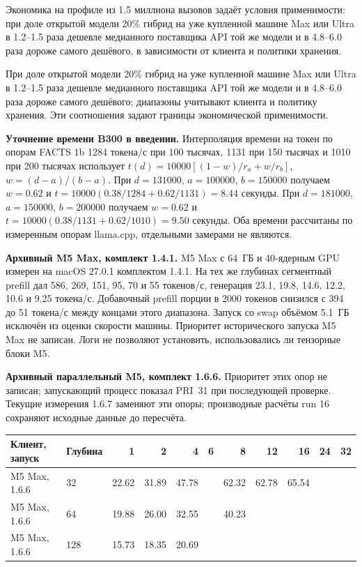 Экономика на профиле из 1.5 миллиона вызовов задаёт условия применимости: при доле открытой модели 20\%
гибрид на уже купленной машине Max или Ultra в 1.2--1.5 раза дешевле медианного поставщика API той же модели
и в 4.8--6.0 раза дороже самого дешёвого, в зависимости от клиента и политики хранения.

При доле открытой модели 20\% гибрид на уже купленной машине Max или Ultra в 1.2--1.5 раза дешевле медианного поставщика API той же модели
и в 4.8--6.0 раза дороже самого дешёвого; диапазоны учитывают клиента и политику хранения.
Эти соотношения задают границы экономической применимости.

\textbf{Уточнение времени B300 в введении.} Интерполяция времени на токен по опорам FACTS 1b
1284 токена/с при 100 тысячах, 1131 при 150 тысячах и 1010 при 200 тысячах использует
$t(d)=10000[(1-w)/r_a+w/r_b]$, $w=(d-a)/(b-a)$.
При $d=131000$, $a=100000$, $b=150000$ получаем $w=0.62$ и
$t=10000(0.38/1284+0.62/1131)=8.44$ секунды.
При $d=181000$, $a=150000$, $b=200000$ получаем $w=0.62$ и
$t=10000(0.38/1131+0.62/1010)=9.50$ секунды.
Оба времени рассчитаны по измеренным опорам llama.cpp, отдельными замерами не являются.

\textbf{Архивный M5 Max, комплект 1.4.1.} M5 Max с 64~ГБ и 40-ядерным GPU измерен на macOS 27.0.1 комплектом 1.4.1.
На тех же глубинах сегментный prefill дал 586, 269, 151, 95, 70 и 55 токенов/с,
генерация 23.1, 19.8, 14.6, 12.2, 10.6 и 9.25 токена/с. Добавочный prefill
порции в 2000 токенов снизился с 394 до 51 токена/с между концами этого диапазона.
Запуск со swap объёмом 5.1~ГБ исключён из оценки скорости машины. Приоритет исторического запуска M5 Max не записан.
Логи не позволяют установить, использовались ли тензорные блоки M5.

\textbf{Архивный параллельный M5, комплект 1.6.6.} Приоритет этих опор не записан;
запускающий процесс показал PRI~31 при последующей проверке. Текущие измерения 1.6.7 заменяют эти опоры;
производные расчёты run 16 сохраняют исходные данные до пересчёта.
\begin{center}
\begin{tabular}{llrrrrrrrrr}
\toprule
Клиент, запуск & Глубина & 1 & 2 & 4 & 6 & 8 & 12 & 16 & 24 & 32 \\
\midrule
M5 Max, 1.6.6 & 32 & 22.62 & 31.89 & 47.78 &  & 62.32 & 62.78 & 65.54 &  &  \\
M5 Max, 1.6.6 & 64 & 19.88 & 26.00 & 32.55 &  & 40.23 &  &  &  &  \\
M5 Max, 1.6.6 & 128 & 15.73 & 18.35 & 20.69 &  &  &  &  &  &  \\
\bottomrule
\end{tabular}
\label{tab:m5-sweep-history}
\end{center}

